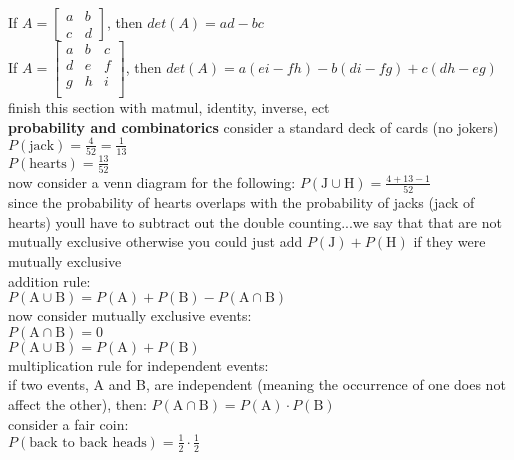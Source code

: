 \documentclass{article}
\begin{document}
If
$ A = 
\begin{bmatrix}
a & b\\
c & d
\end{bmatrix}
$, then $det(A) = ad - bc$\\

If
$ A = 
\begin{bmatrix}
a & b & c\\
d & e & f\\
g & h & i\\
\end{bmatrix}
$, then $det(A) = a(ei - fh) - b(di - fg) + c(dh - eg)$\\

finish this section with matmul, identity, inverse, ect\\




\textbf{probability and combinatorics}
consider a standard deck of cards (no jokers)\\
$P(\text{jack}) = \frac{4}{52} = \frac{1}{13}$\\
$P(\text{hearts}) = \frac{13}{52}$\\

now consider a venn diagram for the following:
$P(\text{J} \cup \text{H}) = \frac{4 + 13 - 1}{52}$\\
since the probability of hearts overlaps with the probability of jacks (jack of hearts) youll have to subtract out the double counting...we say that that are not mutually exclusive otherwise you could just add $P(\text{J}) + P(\text{H})$ if they were mutually exclusive\\

addition rule:\\
$P(\text{A} \cup \text{B}) = P(\text{A}) + P(\text{B}) - P(\text{A} \cap \text{B})$\\

now consider mutually exclusive events:\\
$P(\text{A} \cap \text{B}) = 0$\\
$P(\text{A} \cup \text{B}) = P(\text{A}) + P(\text{B})$\\

multiplication rule for independent events:\\
if two events, A and B, are independent (meaning the occurrence of one does not affect the other), then: $P(\text{A} \cap \text{B}) = P(\text{A}) \cdot P(\text{B})$\\

consider a fair coin:\\
$P(\text{back to back heads}) = \frac{1}{2} \cdot \frac{1}{2}$
\end{document}
